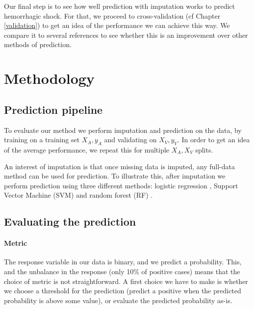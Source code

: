 
Our final step is to see how well prediction with imputation works to predict hemorrhagic shock. For that, we proceed to cross-validation (cf Chapter \ref{validation}) to get an idea of the performance we can achieve this way. We compare it to several references to see whether this is an improvement over other methods of prediction.
	\section{Methodology}
		\subsection{Prediction pipeline}
To evaluate our method we perform imputation and prediction on the data, by training on a training set $X_A, y_A$ and validating on $X_V, y_V$. In order to get an idea of the average performance, we repeat this for multiple $X_A, X_V$ splits.

An interest of imputation is that once missing data is imputed, any full-data method can be used for prediction. To illustrate this, after imputation we perform prediction using three different methods: logistic regression \cite{hosmer2013logreg}, Support Vector Machine (SVM) \cite{hearst1998SVM} and random forest (RF) \cite{svetnik2003RF}. 

		\subsection{Evaluating the prediction}
\paragraph{Metric}
The response variable in our data is binary, and we predict a probability. This, and the unbalance in the response (only 10\% of positive cases) means that the choice of metric is not straightforward. A first choice we have to make is whether we choose a threshold for the prediction (predict a positive when the predicted probability is above some value), or evaluate the predicted probability as-is.

